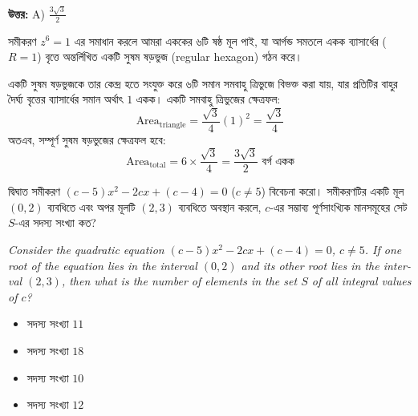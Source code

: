 \documentclass[12pt, a4paper]{article}
\begin{document}
\vspace{0.5em}
\begin{tcolorbox}[answerbox]
    \textbf{\color{success} উত্তর:} A) $\frac{3\sqrt{3}}{2}$
\end{tcolorbox}
\vspace{1em}

\begin{tcolorbox}[solutionbox={সমাধান (Solution)}]
    \noindent
    সমীকরণ $z^6 = 1$ এর সমাধান করলে আমরা এককের ৬টি ষষ্ঠ মূল পাই, যা আর্গন্ড সমতলে একক ব্যাসার্ধের ($R=1$) বৃত্তে অন্তর্লিখিত একটি সুষম ষড়ভুজ (regular hexagon) গঠন করে। 
    
    \vspace{0.5em}
    একটি সুষম ষড়ভুজকে তার কেন্দ্র হতে সংযুক্ত করে ৬টি সমান সমবাহু ত্রিভুজে বিভক্ত করা যায়, যার প্রতিটির বাহুর দৈর্ঘ্য বৃত্তের ব্যাসার্ধের সমান অর্থাৎ $1$ একক। 
    একটি সমবাহু ত্রিভুজের ক্ষেত্রফল:
    \[ \text{Area}_{\text{triangle}} = \frac{\sqrt{3}}{4} (1)^2 = \frac{\sqrt{3}}{4} \]
    অতএব, সম্পূর্ণ সুষম ষড়ভুজের ক্ষেত্রফল হবে:
    \[ \text{Area}_{\text{total}} = 6 \times \frac{\sqrt{3}}{4} = \frac{3\sqrt{3}}{2} \text{ বর্গ একক} \]
\end{tcolorbox}

\begin{tcolorbox}[questionbox={প্রশ্ন (Question) 26}]
    \noindent
    দ্বিঘাত সমীকরণ $(c-5)x^2 - 2cx + (c-4) = 0$ ($c \ne 5$) বিবেচনা করো। সমীকরণটির একটি মূল $(0, 2)$ ব্যবধিতে এবং অপর মূলটি $(2, 3)$ ব্যবধিতে অবস্থান করলে, $c$-এর সম্ভাব্য পূর্ণসাংখ্যিক মানসমূহের সেট $S$-এর সদস্য সংখ্যা কত?
    
    \vspace{0.8em}
    \begin{english}
    \noindent\textit{\color{darkgray}
    Consider the quadratic equation $(c-5)x^2 - 2cx + (c-4) = 0$, $c \ne 5$. If one root of the equation lies in the interval $(0, 2)$ and its other root lies in the interval $(2, 3)$, then what is the number of elements in the set $S$ of all integral values of $c$?
    }
    \end{english}
\end{tcolorbox}

\begin{itemize}[label={}, leftmargin=1cm, itemsep=0.5em]
    \item[\textbf{A)}] সদস্য সংখ্যা $11$
    \item[\textbf{B)}] সদস্য সংখ্যা $18$
    \item[\textbf{C)}] সদস্য সংখ্যা $10$
    \item[\textbf{D)}] সদস্য সংখ্যা $12$
\end{itemize}
\end{document}
